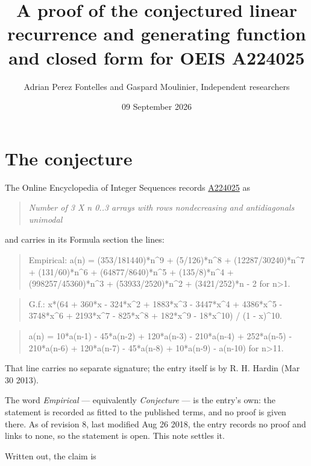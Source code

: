 \documentclass[11pt]{article}
\title{A proof of the conjectured linear recurrence and generating function and closed form for OEIS A224025}
\author{Adrian Perez Fontelles and Gaspard Moulinier, Independent researchers}
\date{09 September 2026}
\theoremstyle{definition}
\begin{document}
\maketitle
\section{The conjecture}

The Online Encyclopedia of Integer Sequences records \href{https://oeis.org/A224025}{A224025} as

\begin{quote}\itshape Number of 3 X n 0..3 arrays with rows nondecreasing and antidiagonals unimodal\end{quote}

and carries in its Formula section the lines:

\begin{quote}\ttfamily Empirical: a(n) = (353/181440)*n\textasciicircum{}9 + (5/126)*n\textasciicircum{}8 + (12287/30240)*n\textasciicircum{}7 + (131/60)*n\textasciicircum{}6 + (64877/8640)*n\textasciicircum{}5 + (135/8)*n\textasciicircum{}4 + (998257/45360)*n\textasciicircum{}3 + (53933/2520)*n\textasciicircum{}2 + (3421/252)*n - 2 for n>1.\end{quote}

\begin{quote}\ttfamily G.f.: x*(64 + 360*x - 324*x\textasciicircum{}2 + 1883*x\textasciicircum{}3 - 3447*x\textasciicircum{}4 + 4386*x\textasciicircum{}5 - 3748*x\textasciicircum{}6 + 2193*x\textasciicircum{}7 - 825*x\textasciicircum{}8 + 182*x\textasciicircum{}9 - 18*x\textasciicircum{}10) / (1 - x)\textasciicircum{}10.\end{quote}

\begin{quote}\ttfamily a(n) = 10*a(n-1) - 45*a(n-2) + 120*a(n-3) - 210*a(n-4) + 252*a(n-5) - 210*a(n-6) + 120*a(n-7) - 45*a(n-8) + 10*a(n-9) - a(n-10) for n>11.\end{quote}

That line carries no separate signature; the entry itself is by R. H. Hardin (Mar 30 2013).

The word {\itshape Empirical} --- equivalently {\itshape Conjecture} --- is the entry's own: the statement is recorded as fitted to the published terms, and no proof is given there. As of revision 8, last modified Aug 26 2018, the entry records no proof and links to none, so the statement is open. This note settles it.

Written out, the claim is
\end{document}
